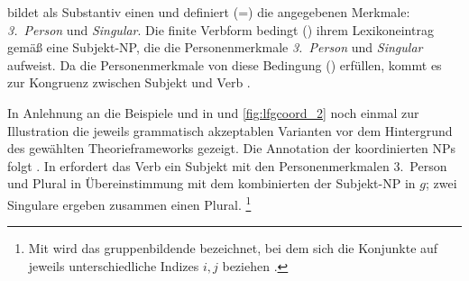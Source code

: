  bildet als Substantiv einen  und
definiert (=) die angegebenen Merk\-male: \emph{3.~Person} und \emph{Singular}.
Die finite Verbform  bedingt (\req) ihrem Lexikoneintrag
gemäß eine Subjekt-NP, die die
Personenmerkmale \emph{3.~Person} und \emph{Singular}
aufweist. Da die Personenmerkmale von  diese
Bedingung () erfüllen, kommt es zur Kongruenz
zwischen Subjekt und Verb \autocite[vgl.][59]{bresnanetal2016}.

In Anlehnung an die Beispiele  und  in
 und \ref{fig:lfgcoord_2} noch einmal zur Illustration
die jeweils grammatisch akzeptablen Varianten vor dem Hintergrund des gewählten
Theorieframeworks gezeigt. Die Annotation der koordinierten
NPs folgt \citet{peterson2004}. In 
erfordert das Verb  ein Subjekt mit den
Personenmerkmalen 3.~Person und Plural in Übereinstimmung
mit dem kombinierten  der Subjekt-NP in $g$; zwei
Singulare ergeben zusammen einen Plural.%
%
	\footnote{Mit  wird das gruppenbildende  bezeichnet, bei
		dem sich die Konjunkte auf jeweils unterschiedliche Indizes $i, j$
		beziehen \autocite[382--383]{dalrymple2001}.}

